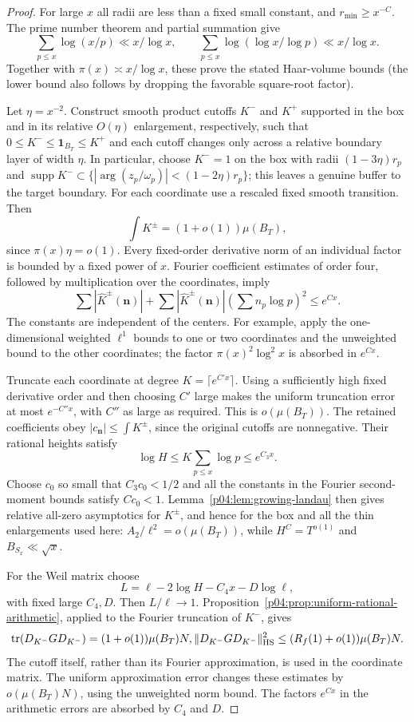 \documentclass[11pt,letterpaper]{article}
\theoremstyle{definition}
\theoremstyle{remark}
\DeclareMathOperator{\supp}{supp}
\DeclareMathOperator{\tr}{tr}
\newcommand{\1}{\mathbf 1}
\begin{document}
\begin{proof}
For large $x$ all radii are less than a fixed small constant, and
$r_{\min}\ge x^{-C}$. The prime number theorem and partial
summation give
\[
 \sum_{p\le x}\log(x/p)\ll x/\log x,
 \qquad
 \sum_{p\le x}\log(\log x/\log p)\ll x/\log x.
\]
Together with $\pi(x)\asymp x/\log x$, these prove the stated
Haar-volume bounds (the lower bound also follows by dropping
the favorable square-root factor).

 Let $\eta=x^{-2}$. Construct smooth product cutoffs $K^-$ and
$K^+$ supported in the box and in its relative $O(\eta)$
enlargement, respectively, such that
$0\le K^-\le\mathbf1_{B_T}\le K^+$ and each cutoff changes
only across a relative boundary layer of width $\eta$. In particular,
choose $K^-=1$ on the box with radii $(1-3\eta)r_p$ and
$\supp K^-\subset\{ |\arg(z_p/\omega_p)|<(1-2\eta)r_p\}$;
this leaves a genuine buffer to the target boundary. For each
coordinate use a rescaled fixed smooth transition. Then
\[
 \int K^\pm=(1+o(1))\mu(B_T),
\]
since $\pi(x)\eta=o(1)$. Every fixed-order derivative norm of an
individual factor is bounded by a fixed power of $x$. Fourier
coefficient estimates of order four, followed by multiplication
over the coordinates, imply
\[
 \sum|\widehat K^\pm(\mathbf n)|+
 \sum|\widehat K^\pm(\mathbf n)|
              \left(\sum n_p\log p\right)^2\le e^{C x}.
\]
The constants are independent of the centers. For example, apply
the one-dimensional weighted $\ell^1$ bounds to one or two
coordinates and the unweighted bound to the other coordinates;
the factor $\pi(x)^2\log^2x$ is absorbed in $e^{Cx}$.

Truncate each coordinate at degree $K=\lceil e^{C'x}\rceil$.
Using a sufficiently high fixed derivative order and then choosing
$C'$ large makes the uniform truncation error at most $e^{-C''x}$,
with $C''$ as large as required. This is $o(\mu(B_T))$.
The retained coefficients obey
$|c_{\mathbf n}|\le\int K^\pm$, since the original cutoffs are
nonnegative. Their rational heights satisfy
\[
 \log H\le K\sum_{p\le x}\log p\le e^{C_3x}.
\]
Choose $c_0$ so small that $C_3c_0<1/2$ and all the constants
in the Fourier second-moment bounds satisfy $Cc_0<1$.
Lemma~\ref{p04:lem:growing-landau} then gives relative all-zero
asymptotics for $K^\pm$, and hence for the box and all the thin
enlargements used here: $A_2/\ell^2=o(\mu(B_T))$, while
$H^C=T^{o(1)}$ and $B_{S_x}\ll\sqrt x$.

For the Weil matrix choose
\[
 L=\ell-2\log H-C_4x-D\log\ell,
\]
with fixed large $C_4,D$. Then $L/\ell\to1$.
Proposition~\ref{p04:prop:uniform-rational-arithmetic}, applied to the
Fourier truncation of $K^-$, gives
\[
 \tr(D_{K^-}GD_{K^-})=(1+o(1))\mu(B_T)N,
 \|D_{K^-}GD_{K^-}\|_{\rm HS}^2
 \le(R_f(1)+o(1))\mu(B_T)N.
\]
The cutoff itself, rather than its Fourier approximation, is used
in the coordinate matrix. The uniform approximation error changes
these estimates by $o(\mu(B_T)N)$, using the unweighted norm
bound. The factors $e^{Cx}$ in the arithmetic errors are absorbed
by $C_4$ and $D$.


\end{proof}
\end{document}
